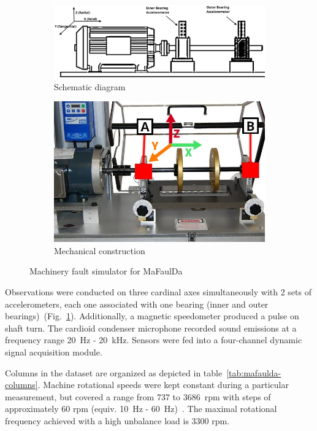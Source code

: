 \begin{figure}[h]
\centering
\begin{subfigure}[b]{0.48\textwidth}
	\includegraphics[width=\textwidth]{assets/analysis/mafaulda-simulator.png}
	\caption{Schematic diagram \cite{pestana-viana_influence_2016}}
\end{subfigure}
\hfill
\begin{subfigure}[b]{0.48\textwidth}
	\includegraphics[width=\textwidth]{assets/design/sensor/mafaulda-simulator.jpg}
	\caption{Mechanical construction \cite{noauthor_spectraquest_nodate}}
\end{subfigure}
\caption{Machinery fault simulator for MaFaulDa}
\label{fig:mafaulda-simulator}
\end{figure}

Observations were conducted on three cardinal axes simultaneously with 2 sets of accelerometers, each one associated with one bearing (inner and outer bearings)~(Fig.~\ref{fig:mafaulda-simulator}). Additionally, a magnetic speedometer produced a pulse on shaft turn. The cardioid condenser microphone recorded sound emissions at a frequency range 20~Hz - 20~kHz. Sensors were fed into a four-channel dynamic signal acquisition module.

Columns in the dataset are organized as depicted in table~\ref{tab:mafaulda-columns}. Machine rotational speeds were kept constant during a particular measurement, but covered a range from 737 to 3686~rpm with steps of approximately 60 rpm (equiv. 10~Hz - 60~Hz)~\cite{pestana-viana_influence_2016}. The maximal rotational frequency achieved with a high unbalance load is 3300 rpm.

